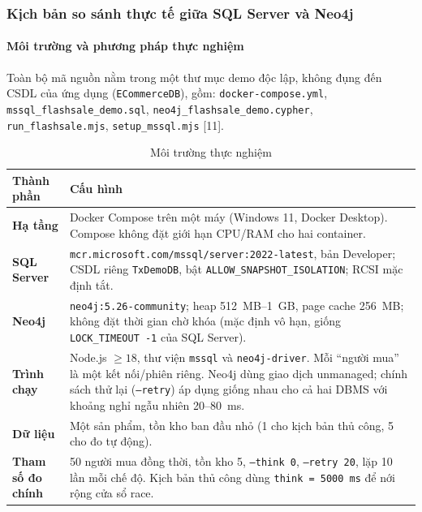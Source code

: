 \subsubsection{Kịch bản so sánh thực tế giữa SQL Server và Neo4j}
\label{subsubsec:tx-exp}

\paragraph{Môi trường và phương pháp thực nghiệm}
\label{par:tx-env}\mbox{}

Toàn bộ mã nguồn nằm trong một thư mục demo độc lập, không đụng đến CSDL của ứng dụng (\texttt{ECommerceDB}), gồm: \texttt{docker-compose.yml}, \texttt{mssql\_flashsale\_demo.sql}, \texttt{neo4j\_flashsale\_demo.cypher}, \texttt{run\_flashsale.mjs}, \texttt{setup\_mssql.mjs} [11].

\begin{table}[htbp]
\centering
\caption{Môi trường thực nghiệm}
\label{tab:tx-env}
\renewcommand{\arraystretch}{1.25}
\begin{tabularx}{\textwidth}{>{\bfseries}l X}
\toprule
Thành phần & \textbf{Cấu hình} \\
\midrule
Hạ tầng & Docker Compose trên một máy (Windows 11, Docker Desktop). Compose không đặt giới hạn CPU/RAM cho hai container. \\
SQL Server & \texttt{mcr.microsoft.com/mssql/server:2022-latest}, bản Developer; CSDL riêng \texttt{TxDemoDB}, bật \texttt{ALLOW\_SNAPSHOT\_ISOLATION}; RCSI mặc định tắt. \\
Neo4j & \texttt{neo4j:5.26-community}; heap 512~MB--1~GB, page cache 256~MB; không đặt thời gian chờ khóa (mặc định vô hạn, giống \texttt{LOCK\_TIMEOUT -1} của SQL Server). \\
Trình chạy & Node.js $\ge 18$, thư viện \texttt{mssql} và \texttt{neo4j-driver}. Mỗi ``người mua'' là một kết nối/phiên riêng. Neo4j dùng giao dịch unmanaged; chính sách thử lại (\texttt{--retry}) áp dụng giống nhau cho cả hai DBMS với khoảng nghỉ ngẫu nhiên 20--80~ms. \\
Dữ liệu & Một sản phẩm, tồn kho ban đầu nhỏ (1 cho kịch bản thủ công, 5 cho đo tự động). \\
Tham số đo chính & 50 người mua đồng thời, tồn kho 5, \texttt{--think 0}, \texttt{--retry 20}, lặp 10 lần mỗi chế độ. Kịch bản thủ công dùng \texttt{think = 5000~ms} để nới rộng cửa sổ race. \\
\bottomrule
\end{tabularx}
\end{table}

